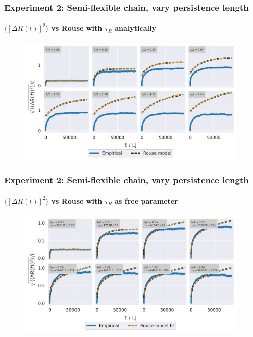 \documentclass[handout]{beamer}
\newcommand{\mean}[1]{\langle #1 \rangle}
\begin{document}
\begin{frame}
    \frametitle{Experiment 2: Semi-flexible chain, vary persistence length}
    \framesubtitle{$\mean{[\Delta R(t)]^2}$ vs Rouse with $\tau_R$ analytically}

    \begin{figure}[h]
        \includegraphics[width=11cm]{./4-exp-delta_R-rouse_anal.png}
    \end{figure}
\end{frame}


\begin{frame}
    \frametitle{Experiment 2: Semi-flexible chain, vary persistence length}
    \framesubtitle{$\mean{[\Delta R(t)]^2}$ vs Rouse with $\tau_R$ as free parameter}

    \begin{figure}[h]
        \includegraphics[width=11cm]{./4-exp-delta_R-rouse_fit-tau.png}
    \end{figure}
\end{frame}
\end{document}
